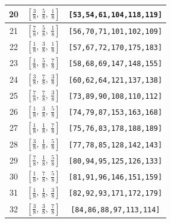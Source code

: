 \documentclass[fleqn,8pt]{jsarticle}
\begin{document}
\begin{longtable}{ccc}
20 & $\left[ \frac{3}{8},\, \frac{5}{8},\, \frac{1}{8} \right]$ & {\tt [53,54,61,104,118,119]} \\ \hline
21 & $\left[ \frac{7}{8},\, \frac{5}{8},\, \frac{1}{8} \right]$ & {\tt [56,70,71,101,102,109]} \\ \hline
22 & $\left[ \frac{1}{8},\, \frac{3}{8},\, \frac{1}{8} \right]$ & {\tt [57,67,72,170,175,183]} \\ \hline
23 & $\left[ \frac{1}{8},\, \frac{5}{8},\, \frac{7}{8} \right]$ & {\tt [58,68,69,147,148,155]} \\ \hline
24 & $\left[ \frac{3}{8},\, \frac{7}{8},\, \frac{3}{8} \right]$ & {\tt [60,62,64,121,137,138]} \\ \hline
25 & $\left[ \frac{7}{8},\, \frac{7}{8},\, \frac{3}{8} \right]$ & {\tt [73,89,90,108,110,112]} \\ \hline
26 & $\left[ \frac{1}{8},\, \frac{3}{8},\, \frac{5}{8} \right]$ & {\tt [74,79,87,153,163,168]} \\ \hline
27 & $\left[ \frac{1}{8},\, \frac{1}{8},\, \frac{7}{8} \right]$ & {\tt [75,76,83,178,188,189]} \\ \hline
28 & $\left[ \frac{3}{8},\, \frac{1}{8},\, \frac{5}{8} \right]$ & {\tt [77,78,85,128,142,143]} \\ \hline
29 & $\left[ \frac{7}{8},\, \frac{1}{8},\, \frac{5}{8} \right]$ & {\tt [80,94,95,125,126,133]} \\ \hline
30 & $\left[ \frac{1}{8},\, \frac{7}{8},\, \frac{5}{8} \right]$ & {\tt [81,91,96,146,151,159]} \\ \hline
31 & $\left[ \frac{1}{8},\, \frac{1}{8},\, \frac{3}{8} \right]$ & {\tt [82,92,93,171,172,179]} \\ \hline
32 & $\left[ \frac{3}{8},\, \frac{3}{8},\, \frac{7}{8} \right]$ & {\tt [84,86,88,97,113,114]} \\
\end{longtable}
\renewcommand{\arraystretch}{1.2}
\end{document}
